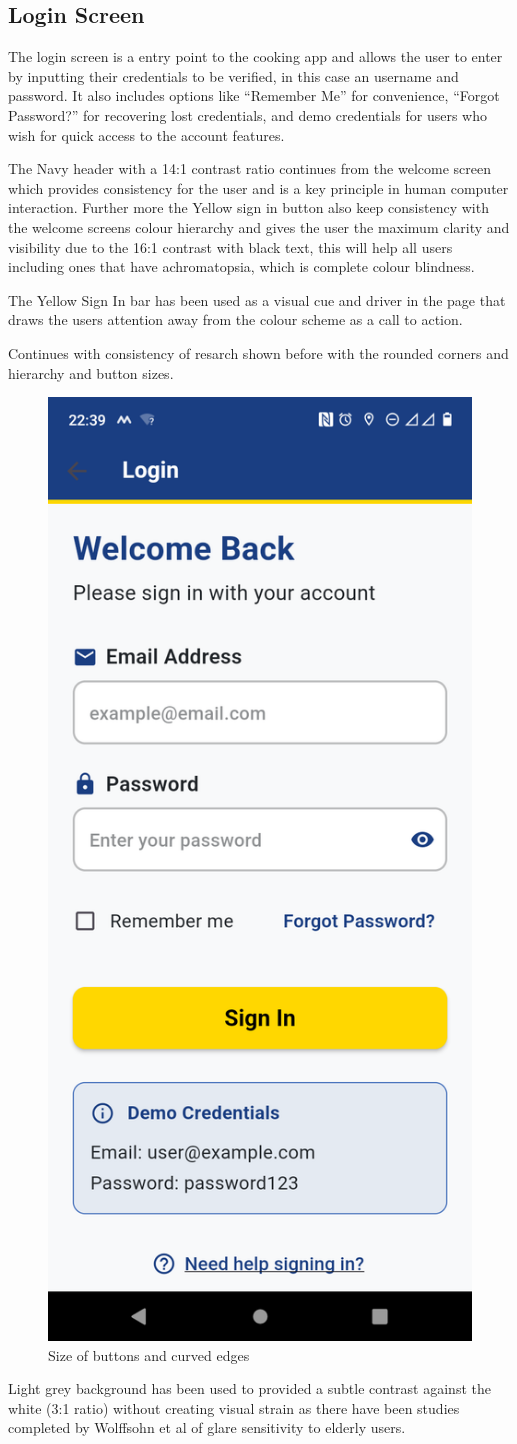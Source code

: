 \documentclass[]{project_final}
\begin{document}

\subsection{Login Screen}
The login screen is a entry point to the cooking app and allows the user to enter by inputting their credentials to be verified, in this case an username and password. It also includes options like “Remember Me” for convenience, “Forgot Password?” for recovering lost credentials, and demo credentials for users who wish for quick access to the account features.

The Navy header with a 14:1 contrast ratio continues from the welcome screen which provides consistency for the user and is a key principle in human computer interaction.
Further more the Yellow sign in button also keep consistency with the welcome screens colour hierarchy and gives the user the maximum clarity and visibility due to the 16:1 contrast with black text, this will help all users including ones that have achromatopsia, which is complete colour blindness.

The Yellow Sign In bar has been used as a visual cue and driver in the page that draws the users attention away from the colour scheme as a call to action.

Continues with consistency of resarch shown before with the rounded corners and hierarchy and button sizes.

\begin{figure}[ht!]
  \centering
  \includegraphics[height=0.4\textwidth]{M Login screen.png}
  \caption{Size of buttons and curved edges}
  \label{fig:1}
\end{figure}

Light grey background has been used to provided a subtle contrast against the white (3:1 ratio) without creating visual strain as there have been studies completed by Wolffsohn et al of glare sensitivity to elderly users.
\end{document}
